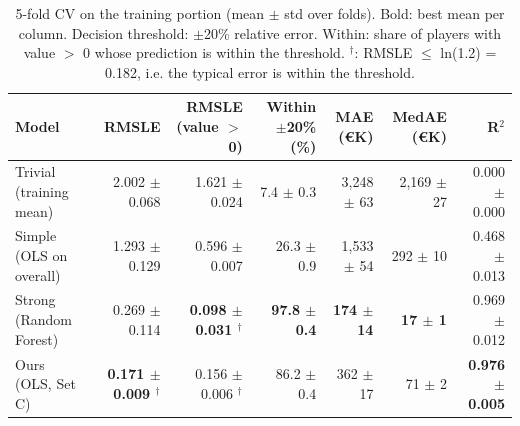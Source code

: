 \begin{table}[t]
\centering
\small
\begin{tabular}{lrrrrrr}
\toprule
Model & RMSLE & RMSLE (value $>$ 0) & Within $\pm$20\% (\%) & MAE (\euro{}K) & MedAE (\euro{}K) & R$^2$ \\
\midrule
Trivial (training mean) & 2.002 $\pm$ 0.068 & 1.621 $\pm$ 0.024 & 7.4 $\pm$ 0.3 & 3,248 $\pm$ 63 & 2,169 $\pm$ 27 & 0.000 $\pm$ 0.000 \\
Simple (OLS on overall) & 1.293 $\pm$ 0.129 & 0.596 $\pm$ 0.007 & 26.3 $\pm$ 0.9 & 1,533 $\pm$ 54 & 292 $\pm$ 10 & 0.468 $\pm$ 0.013 \\
Strong (Random Forest) & 0.269 $\pm$ 0.114 & \textbf{0.098 $\pm$ 0.031 $^\dagger$} & \textbf{97.8 $\pm$ 0.4} & \textbf{174 $\pm$ 14} & \textbf{17 $\pm$ 1} & 0.969 $\pm$ 0.012 \\
Ours (OLS, Set C) & \textbf{0.171 $\pm$ 0.009 $^\dagger$} & 0.156 $\pm$ 0.006 $^\dagger$ & 86.2 $\pm$ 0.4 & 362 $\pm$ 17 & 71 $\pm$ 2 & \textbf{0.976 $\pm$ 0.005} \\
\bottomrule
\end{tabular}
\caption{5-fold CV on the training portion (mean $\pm$ std over folds). Bold: best mean per column. Decision threshold: $\pm$20\% relative error. Within: share of players with value $>$ 0 whose prediction is within the threshold. $^\dagger$: RMSLE $\leq$ ln(1.2) = 0.182, i.e. the typical error is within the threshold.}
\label{tab:main_cv}
\end{table}
